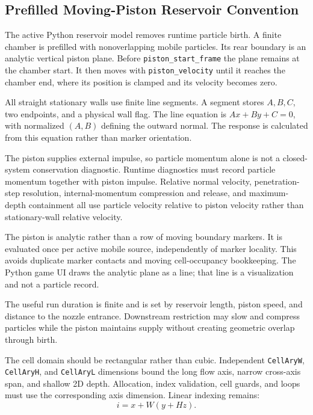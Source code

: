\subsection{Prefilled Moving-Piston Reservoir Convention}

The active Python reservoir model removes runtime particle birth.  A finite
chamber is prefilled with nonoverlapping mobile particles.  Its rear boundary is an analytic vertical
piston plane.  Before \texttt{piston\_start\_frame} the plane remains at the
chamber start.  It then moves with \texttt{piston\_velocity} until
it reaches the chamber end, where its position is clamped and its velocity
becomes zero.

All straight stationary walls use finite line segments.  A segment stores
\(A,B,C\), two endpoints, and a physical wall flag.  The line equation is
\(Ax+By+C=0\), with normalized \((A,B)\) defining the outward normal.  The
response is calculated from this equation rather than marker orientation.

The piston supplies external impulse, so particle momentum alone is not a
closed-system conservation diagnostic.  Runtime diagnostics must record
particle momentum together with piston impulse.  Relative normal velocity,
penetration-step resolution, internal-momentum compression and release, and
maximum-depth containment all use particle velocity relative to piston
velocity rather than stationary-wall relative velocity.

The piston is analytic rather than a row of moving boundary markers.  It is
evaluated once per active mobile source, independently of marker locality.
This avoids duplicate marker contacts and moving cell-occupancy bookkeeping.
The Python game UI draws the analytic plane as a line; that line is a
visualization and not a particle record.

The useful run duration is finite and is set by reservoir length, piston
speed, and distance to the nozzle entrance.  Downstream restriction may slow
and compress particles while the piston maintains supply without creating
geometric overlap through birth.

The cell domain should be rectangular rather than cubic.  Independent
\texttt{CellAryW}, \texttt{CellAryH}, and \texttt{CellAryL} dimensions bound
the long flow axis, narrow cross-axis span, and shallow 2D depth.  Allocation,
index validation, cell guards, and loops must use the corresponding axis
dimension.  Linear indexing remains:
\begin{equation}
i=x+W(y+Hz).
\end{equation}

